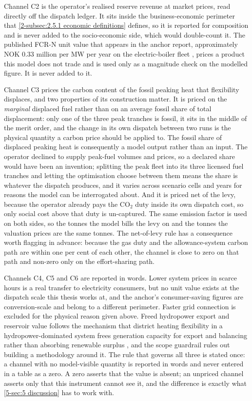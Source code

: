 Channel C2 is the operator's realised reserve revenue at market prices, read directly off the dispatch ledger. It sits inside the business-economic perimeter that \autoref{2-subsec:2.5.1 economic definitions} defines, so it is reported for composition and is never added to the socio-economic side, which would double-count it. The published FCR-N unit value that appears in the anchor report, approximately NOK 0.33 million per MW per year on the electric-boiler fleet \cite{Thema_fjernvarme_2024}, prices a product this model does not trade and is used only as a magnitude check on the modelled figure. It is never added to it.

Channel C3 prices the carbon content of the fossil peaking heat that flexibility displaces, and two properties of its construction matter. It is priced on the \emph{marginal} displaced fuel rather than on an average fossil share of total displacement: only one of the three peak tranches is fossil, it sits in the middle of the merit order, and the change in its own dispatch between two runs is the physical quantity a carbon price should be applied to. The fossil share of displaced peaking heat is consequently a model output rather than an input. The operator declined to supply peak-fuel volumes and prices, so a declared share would have been an invention; splitting the peak fleet into its three licensed fuel tranches and letting the optimisation choose between them means the share is whatever the dispatch produces, and it varies across scenario cells and years for reasons the model can be interrogated about. And it is priced net of the levy, because the operator already pays the CO$_2$ duty inside its own dispatch cost, so only social cost above that duty is un-captured. The same emission factor is used on both sides, so the tonnes the model bills the levy on and the tonnes the valuation prices are the same tonnes. The net-of-levy rule has a consequence worth flagging in advance: because the gas duty and the allowance-system carbon path are within one per cent of each other, the channel is close to zero on that path and non-zero only on the effort-sharing path.

Channels C4, C5 and C6 are reported in words. Lower system prices in scarce hours is a real transfer to electricity consumers, but no unit value exists at the dispatch scale this thesis works at, and the anchor's consumer-saving figures are conversion-scale and belong to a different perimeter. Faster grid connection is excluded for the physical reason given above. Freed hydropower export and reservoir value follows the mechanism that district heating flexibility in a hydropower-dominated system frees generation capacity for export and balancing rather than absorbing renewable surplus \cite{askeland_balancing_2019}, and the scope guardrail rules out building a methodology around it. The rule that governs all three is stated once: a channel with no model-visible quantity is reported in words and never entered in a table as a zero. A zero asserts that the value is absent; an unpriced channel asserts only that this instrument cannot see it, and the difference is exactly what \autoref{5-sec:5 discussion} has to work with.

